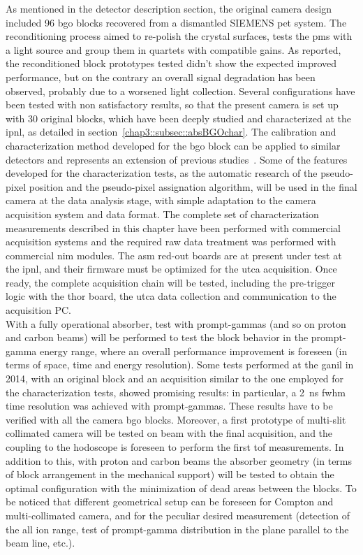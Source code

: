 As mentioned in the detector description section, the original camera design included 96 \gls{bgo} blocks recovered from a dismantled SIEMENS \gls{pet} system. The reconditioning process aimed to re-polish the crystal surfaces, tests the \glspl{pm} with a light source and group them in quartets with compatible gains. As reported, the reconditioned block prototypes tested didn't show the expected improved performance, but on the contrary an overall signal degradation has been observed, probably due to a worsened light collection. Several configurations have been tested with non satisfactory results, so that the present camera is set up with 30 original blocks, which have been deeply studied and characterized at the \gls{ipnl}, as detailed in section~\ref{chap3::subsec::absBGOchar}. The calibration and characterization method developed for the \gls{bgo} block can be applied to similar detectors and represents an extension of previous studies~\parencite{Rogers1994, Tornai1994, Golnik2015, HuesoGonzalez2015}. Some of the features developed for the characterization tests, as the automatic research of the pseudo-pixel position and the pseudo-pixel assignation algorithm, will be used in the final camera at the data analysis stage, with simple adaptation to the camera acquisition system and data format. The complete set of characterization measurements described in this chapter have been performed with commercial acquisition systems and the required raw data treatment was performed with commercial \gls{nim} modules. The \gls{asm} red-out boards are at present under test at the \gls{ipnl}, and their firmware must be optimized for the \gls{utca} acquisition. Once ready, the complete acquisition chain will be tested, including the pre-trigger logic with the \gls{thor} board, the \gls{utca} data collection and communication to the acquisition PC.\\ With a fully operational absorber, test with prompt-gammas (and so on proton and carbon beams) will be performed to test the block behavior in the prompt-gamma energy range, where an overall performance improvement is foreseen (in terms of space, time and energy resolution). Some tests performed at the \gls{ganil} in 2014, with an original block and an acquisition similar to the one employed for the characterization tests, showed promising results: in particular, a 2~ns \gls{fwhm} time resolution was achieved with prompt-gammas. These results have to be verified with all the camera \gls{bgo} blocks. Moreover, a first prototype of multi-slit collimated camera will be tested on beam with the final acquisition, and the coupling to the hodoscope is foreseen to perform the first \gls{tof} measurements. In addition to this, with proton and carbon beams the absorber geometry (in terms of block arrangement in the mechanical support) will be tested to obtain the optimal configuration with the minimization of dead areas between the blocks. To be noticed that different geometrical setup can be foreseen for Compton and multi-collimated camera, and for the peculiar desired measurement (detection of the all ion range, test of prompt-gamma distribution in the plane parallel to the beam line, etc.).\\
